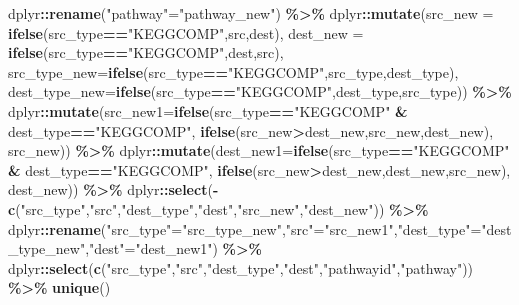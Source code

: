 \documentclass[
]{book}
\newenvironment{Shaded}{\begin{snugshade}}{\end{snugshade}}
\newcommand{\AttributeTok}[1]{\textcolor[rgb]{0.13,0.29,0.53}{#1}}
\newcommand{\FunctionTok}[1]{\textcolor[rgb]{0.13,0.29,0.53}{\textbf{#1}}}
\newcommand{\NormalTok}[1]{#1}
\newcommand{\OtherTok}[1]{\textcolor[rgb]{0.56,0.35,0.01}{#1}}
\newcommand{\SpecialCharTok}[1]{\textcolor[rgb]{0.81,0.36,0.00}{\textbf{#1}}}
\newcommand{\StringTok}[1]{\textcolor[rgb]{0.31,0.60,0.02}{#1}}
\begin{document}
\begin{Shaded}
\begin{Highlighting}[]
\NormalTok{  dplyr}\SpecialCharTok{::}\FunctionTok{rename}\NormalTok{(}\StringTok{"pathway"}\OtherTok{=}\StringTok{"pathway\_new"}\NormalTok{) }\SpecialCharTok{\%\textgreater{}\%}
\NormalTok{  dplyr}\SpecialCharTok{::}\FunctionTok{mutate}\NormalTok{(}\AttributeTok{src\_new =} \FunctionTok{ifelse}\NormalTok{(src\_type}\SpecialCharTok{==}\StringTok{"KEGGCOMP"}\NormalTok{,src,dest),}
                \AttributeTok{dest\_new =} \FunctionTok{ifelse}\NormalTok{(src\_type}\SpecialCharTok{==}\StringTok{"KEGGCOMP"}\NormalTok{,dest,src),}
                \AttributeTok{src\_type\_new=}\FunctionTok{ifelse}\NormalTok{(src\_type}\SpecialCharTok{==}\StringTok{"KEGGCOMP"}\NormalTok{,src\_type,dest\_type),}
                \AttributeTok{dest\_type\_new=}\FunctionTok{ifelse}\NormalTok{(src\_type}\SpecialCharTok{==}\StringTok{"KEGGCOMP"}\NormalTok{,dest\_type,src\_type)) }\SpecialCharTok{\%\textgreater{}\%}
\NormalTok{  dplyr}\SpecialCharTok{::}\FunctionTok{mutate}\NormalTok{(}\AttributeTok{src\_new1=}\FunctionTok{ifelse}\NormalTok{(src\_type}\SpecialCharTok{==}\StringTok{"KEGGCOMP"} \SpecialCharTok{\&}\NormalTok{ dest\_type}\SpecialCharTok{==}\StringTok{"KEGGCOMP"}\NormalTok{,}
                                \FunctionTok{ifelse}\NormalTok{(src\_new}\SpecialCharTok{\textgreater{}}\NormalTok{dest\_new,src\_new,dest\_new),}
\NormalTok{                                src\_new)) }\SpecialCharTok{\%\textgreater{}\%}
\NormalTok{  dplyr}\SpecialCharTok{::}\FunctionTok{mutate}\NormalTok{(}\AttributeTok{dest\_new1=}\FunctionTok{ifelse}\NormalTok{(src\_type}\SpecialCharTok{==}\StringTok{"KEGGCOMP"} \SpecialCharTok{\&}\NormalTok{ dest\_type}\SpecialCharTok{==}\StringTok{"KEGGCOMP"}\NormalTok{,}
                                 \FunctionTok{ifelse}\NormalTok{(src\_new}\SpecialCharTok{\textgreater{}}\NormalTok{dest\_new,dest\_new,src\_new),}
\NormalTok{                                 dest\_new)) }\SpecialCharTok{\%\textgreater{}\%}
\NormalTok{  dplyr}\SpecialCharTok{::}\FunctionTok{select}\NormalTok{(}\SpecialCharTok{{-}}\FunctionTok{c}\NormalTok{(}\StringTok{"src\_type"}\NormalTok{,}\StringTok{"src"}\NormalTok{,}\StringTok{"dest\_type"}\NormalTok{,}\StringTok{"dest"}\NormalTok{,}\StringTok{"src\_new"}\NormalTok{,}\StringTok{"dest\_new"}\NormalTok{)) }\SpecialCharTok{\%\textgreater{}\%}
\NormalTok{  dplyr}\SpecialCharTok{::}\FunctionTok{rename}\NormalTok{(}\StringTok{"src\_type"}\OtherTok{=}\StringTok{"src\_type\_new"}\NormalTok{,}\StringTok{"src"}\OtherTok{=}\StringTok{"src\_new1"}\NormalTok{,}\StringTok{"dest\_type"}\OtherTok{=}\StringTok{"dest\_type\_new"}\NormalTok{,}\StringTok{"dest"}\OtherTok{=}\StringTok{"dest\_new1"}\NormalTok{) }\SpecialCharTok{\%\textgreater{}\%}
\NormalTok{  dplyr}\SpecialCharTok{::}\FunctionTok{select}\NormalTok{(}\FunctionTok{c}\NormalTok{(}\StringTok{"src\_type"}\NormalTok{,}\StringTok{"src"}\NormalTok{,}\StringTok{"dest\_type"}\NormalTok{,}\StringTok{"dest"}\NormalTok{,}\StringTok{"pathwayid"}\NormalTok{,}\StringTok{"pathway"}\NormalTok{)) }\SpecialCharTok{\%\textgreater{}\%}
  \FunctionTok{unique}\NormalTok{()}


\end{Highlighting}
\end{Shaded}
\end{document}

